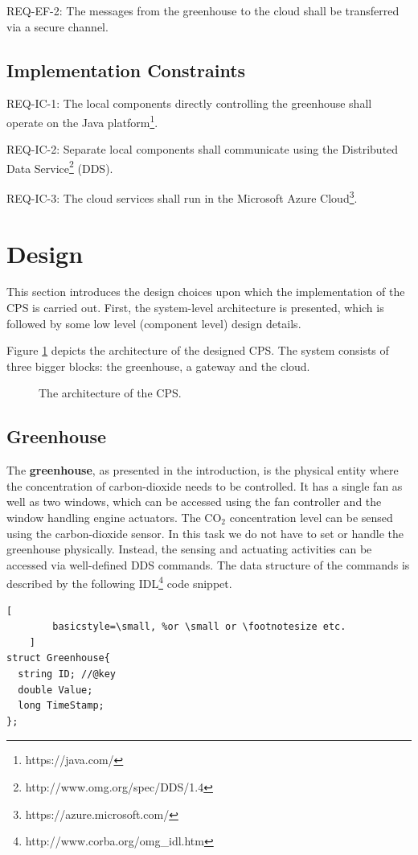 \documentclass[a4paper, 11pt]{article}
\begin{document}
	REQ-EF-2: The messages from the greenhouse to the cloud shall be transferred via a secure channel.
	
	\subsection{Implementation Constraints}
	REQ-IC-1: The local components directly controlling the greenhouse shall operate on the Java platform\footnote{https://java.com/}.
	
	REQ-IC-2: Separate local components shall communicate using the Distributed Data Service\footnote{http://www.omg.org/spec/DDS/1.4} (DDS).
	
	REQ-IC-3: The cloud services shall run in the Microsoft Azure Cloud\footnote{https://azure.microsoft.com/}.
	
	\section{Design}
	\label{sec:design}
	This section introduces the design	choices upon which the implementation of the CPS is carried out. First, the system-level architecture is presented, which is followed by some low level (component level) design details.
	
	Figure \ref{fig:architecture} depicts the architecture of the designed CPS. The system consists of three bigger blocks: the greenhouse, a gateway and the cloud. 
		
		\begin{figure}[h!]
			\center
			\caption{The architecture of the CPS.}
			\label{fig:architecture}
		\end{figure}

	\subsection{Greenhouse}
	\label{sec:greenhouse}
	The \textbf{greenhouse}, as presented in the introduction, is the physical entity where the concentration of carbon-dioxide needs to be controlled. It has a single fan as well as two windows, which can be accessed using the fan controller and the window handling engine actuators. The CO$_2$ concentration level can be sensed using the carbon-dioxide sensor. In this task we do not have to set or handle the greenhouse physically. Instead, the sensing and actuating activities can be accessed via well-defined DDS commands. The data structure of the commands is described by the following IDL\footnote{http://www.corba.org/omg\_idl.htm} code snippet.
	\begin{lstlisting}[
		basicstyle=\small, %or \small or \footnotesize etc.
	]
struct Greenhouse{
  string ID; //@key
  double Value;
  long TimeStamp;
};
	\end{lstlisting}
	
\end{document}

